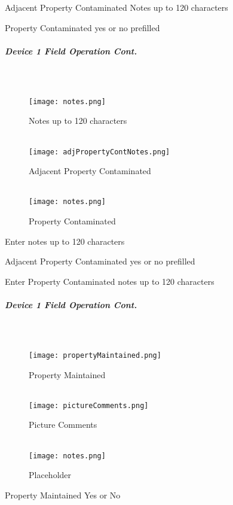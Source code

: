 \documentclass[class=article , crop=false, titlepage, twoside, multi={itemize, figure, verbatim}, float=false]{standalone}
\begin{document}
\noindent Adjacent Property Contaminated Notes up to 120 characters\\
\vspace{2in}

\noindent Property Contaminated yes or no prefilled\\

\clearpage
\subparagraph*{Device 1 Field Operation Cont.}
\subparagraph*{\\}
\begin{wrapfigure}{r}{0.5\textwidth}
\centering
\texttt{[image: notes.png]}
\caption {Notes up to 120 characters}
\vspace{.2in}
\HRule \\[.4cm] %
\vspace{.2in}
\texttt{[image: adjPropertyContNotes.png]}
\caption{Adjacent Property Contaminated}
\vspace{.2in}
\HRule \\[.4cm] %
\vspace{.2in}
\texttt{[image: notes.png]}
\caption{Property Contaminated}
\end{wrapfigure}
Enter notes up to 120 characters\\
\vspace{2in}

\noindent Adjacent Property Contaminated yes or no prefilled\\
\vspace{2in}

\noindent Enter Property Contaminated notes up to 120 characters\\

\clearpage
\subparagraph*{Device 1 Field Operation Cont.}
\subparagraph*{\\}
\begin{wrapfigure}{r}{0.5\textwidth}
\centering
\texttt{[image: propertyMaintained.png]}
\caption {Property Maintained}
\vspace{.15in}
\HRule \\[.4cm] %
\vspace{.2in}
\texttt{[image: pictureComments.png]}
\caption{Picture Comments}
\vspace{.15in}
\HRule \\[.4cm] %
\vspace{.2in}
\texttt{[image: notes.png]}
\caption{Placeholder}
\end{wrapfigure}
Property Maintained Yes or No\\
\vspace{2in}
\end{document}
